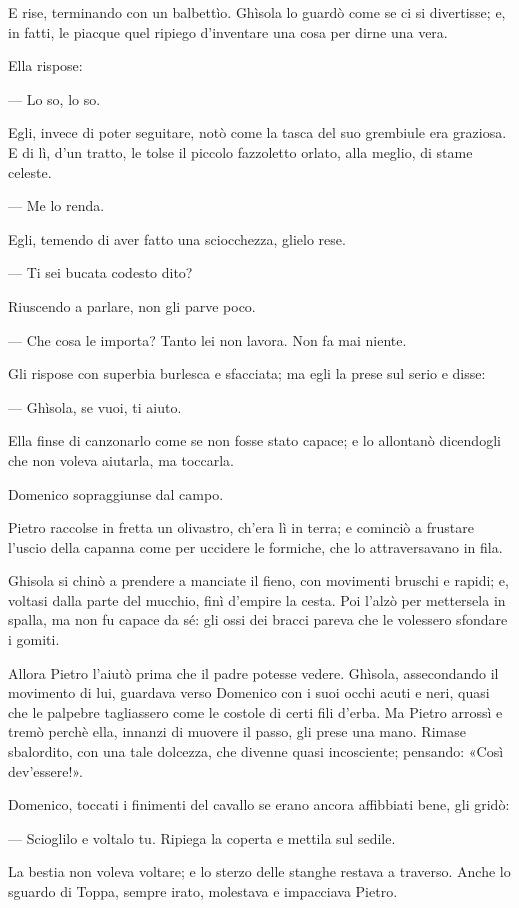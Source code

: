 E rise, terminando con un balbettìo. Ghìsola lo guardò come se ci si divertisse; e, in fatti, le piacque quel ripiego d'inventare una cosa per dirne una vera.

Ella rispose:

— Lo so, lo so.

Egli, invece di poter seguitare, notò come la tasca del suo grembiule era graziosa. E di lì, d'un tratto, le tolse il piccolo fazzoletto orlato, alla meglio, di stame celeste.

— Me lo renda.

Egli, temendo di aver fatto una sciocchezza, glielo rese.

— Ti sei bucata codesto dito?

Riuscendo a parlare, non gli parve poco.

— Che cosa le importa? Tanto lei non lavora. Non fa mai niente.

Gli rispose con superbia burlesca e sfacciata; ma egli la prese sul serio e disse:

— Ghìsola, se vuoi, ti aiuto.

Ella finse di canzonarlo come se non fosse stato capace; e lo allontanò dicendogli che non voleva aiutarla, ma toccarla.

Domenico sopraggiunse dal campo.

Pietro raccolse in fretta un olivastro, ch'era lì in terra; e cominciò a frustare l'uscio della capanna come per uccidere le formiche, che lo attraversavano in fila.

Ghisola si chinò a prendere a manciate il fieno, con movimenti bruschi e rapidi; e, voltasi dalla parte del mucchio, finì d'empire la cesta. Poi l'alzò per mettersela in spalla, ma non fu capace da sé: gli ossi dei bracci pareva che le volessero sfondare i gomiti.

Allora Pietro l'aiutò prima che il padre potesse vedere. Ghìsola, assecondando il movimento di lui, guardava verso Domenico con i suoi occhi acuti e neri, quasi che le palpebre tagliassero come le costole di certi fili d'erba. Ma Pietro arrossì e tremò perchè ella, innanzi di muovere il passo, gli prese una mano. Rimase sbalordito, con una tale dolcezza, che divenne quasi incosciente; pensando: «Così dev'essere!».

Domenico, toccati i finimenti del cavallo se erano ancora affibbiati bene, gli gridò:

— Scioglilo e voltalo tu. Ripiega la coperta e mettila sul sedile.

La bestia non voleva voltare; e lo sterzo delle stanghe restava a traverso. Anche lo sguardo di Toppa, sempre irato, molestava e impacciava Pietro.

